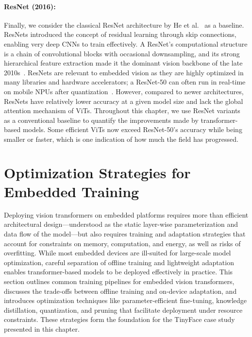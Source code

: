 \documentclass[runningheads,a4paper]{llncs}
\begin{document}
\paragraph{ResNet (2016):} Finally, we consider the classical ResNet architecture by He et al.~\cite{he2016resnet} as a baseline. ResNets introduced the concept of residual learning through skip connections, enabling very deep CNNs to train effectively. A ResNet’s computational structure is a chain of convolutional blocks with occasional downsampling, and its strong hierarchical feature extraction made it the dominant vision backbone of the late 2010s~\cite{he2016resnet}. ResNets are relevant to embedded vision as they are highly optimized in many libraries and hardware accelerators; a ResNet-50 can often run in real-time on mobile NPUs after quantization~\cite{ignatov2021ai_benchmark,android2025optimization}. However, compared to newer architectures, ResNets have relatively lower accuracy at a given model size and lack the global attention mechanism of ViTs. Throughout this chapter, we use ResNet variants as a conventional baseline to quantify the improvements made by transformer-based models. Some efficient ViTs now exceed ResNet-50's accuracy while being smaller or faster, which is one indication of how much the field has progressed.

\section{Optimization Strategies for Embedded Training}\label{sec:optim}
Deploying vision transformers on embedded platforms requires more than efficient architectural design---understood as the static layer-wise parameterization and data flow of the model---but also requires training and adaptation strategies that account for constraints on memory, computation, and energy, as well as risks of overfitting. While most embedded devices are ill-suited for large-scale model optimization, careful separation of offline training and lightweight adaptation enables transformer-based models to be deployed effectively in practice. This section outlines common training pipelines for embedded vision transformers, discusses the trade-offs between offline training and on-device adaptation, and introduces optimization techniques like parameter-efficient fine-tuning, knowledge distillation, quantization, and pruning that facilitate deployment under resource constraints. These strategies form the foundation for the TinyFace case study presented in this chapter.
\end{document}

